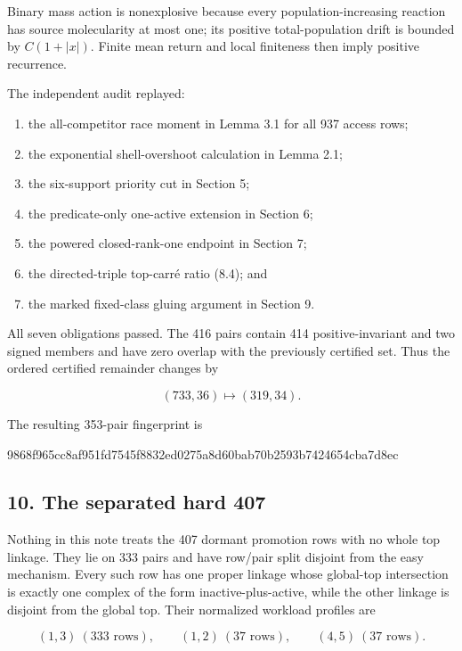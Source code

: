 Binary mass action is nonexplosive because every population-increasing
reaction has source molecularity at most one; its positive
total-population drift is bounded by \(C(1+|x|)\). Finite mean return
and local finiteness then imply positive recurrence.

The independent audit replayed:

\begin{enumerate}
\def\labelenumi{\arabic{enumi}.}
\tightlist
\item
  the all-competitor race moment in Lemma 3.1 for all 937 access rows;
\item
  the exponential shell-overshoot calculation in Lemma 2.1;
\item
  the six-support priority cut in Section 5;
\item
  the predicate-only one-active extension in Section 6;
\item
  the powered closed-rank-one endpoint in Section 7;
\item
  the directed-triple top-carré ratio (8.4); and
\item
  the marked fixed-class gluing argument in Section 9.
\end{enumerate}

All seven obligations passed. The 416 pairs contain 414
positive-invariant and two signed members and have zero overlap with the
previously certified set. Thus the ordered certified remainder changes
by

\[
 (733,36)\longmapsto(319,34).                        \tag{9.2}
\]

The resulting 353-pair fingerprint is

\begin{CodeBlock}
9868f965cc8af951fd7545f8832ed0275a8d60bab70b2593b7424654cba7d8ec
\end{CodeBlock}

\subsection{10. The separated hard 407}

Nothing in this note treats the 407 dormant promotion rows with no whole
top linkage. They lie on 333 pairs and have row/pair split disjoint from
the easy mechanism. Every such row has one proper linkage whose
global-top intersection is exactly one complex of the form
inactive-plus-active, while the other linkage is disjoint from the
global top. Their normalized workload profiles are

\[
 (1,3)\ (333\text{ rows}),\qquad
 (1,2)\ (37\text{ rows}),\qquad
 (4,5)\ (37\text{ rows}).                            \tag{10.1}
\]

